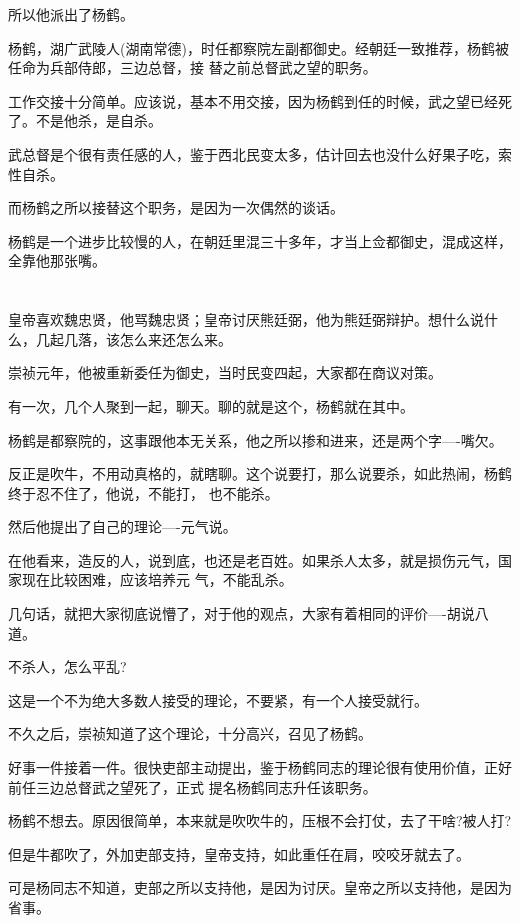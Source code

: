 \documentclass[11pt,a4paper,onecolumn]{article}
\begin{document}
所以他派出了杨鹤。

杨鹤，湖广武陵人(湖南常德)，时任都察院左副都御史。经朝廷一致推荐，杨鹤被任命为兵部侍郎，三边总督，接
替之前总督武之望的职务。

工作交接十分简单。应该说，基本不用交接，因为杨鹤到任的时候，武之望已经死了。不是他杀，是自杀。

武总督是个很有责任感的人，鉴于西北民变太多，估计回去也没什么好果子吃，索性自杀。

而杨鹤之所以接替这个职务，是因为一次偶然的谈话。

杨鹤是一个进步比较慢的人，在朝廷里混三十多年，才当上佥都御史，混成这样，全靠他那张嘴。

\section[\thesection]{}

皇帝喜欢魏忠贤，他骂魏忠贤；皇帝讨厌熊廷弼，他为熊廷弼辩护。想什么说什么，几起几落，该怎么来还怎么来。

崇祯元年，他被重新委任为御史，当时民变四起，大家都在商议对策。

有一次，几个人聚到一起，聊天。聊的就是这个，杨鹤就在其中。

杨鹤是都察院的，这事跟他本无关系，他之所以掺和进来，还是两个字----嘴欠。

反正是吹牛，不用动真格的，就瞎聊。这个说要打，那么说要杀，如此热闹，杨鹤终于忍不住了，他说，不能打，
也不能杀。

然后他提出了自己的理论----元气说。

在他看来，造反的人，说到底，也还是老百姓。如果杀人太多，就是损伤元气，国家现在比较困难，应该培养元
气，不能乱杀。

几句话，就把大家彻底说懵了，对于他的观点，大家有着相同的评价----胡说八道。

不杀人，怎么平乱?

这是一个不为绝大多数人接受的理论，不要紧，有一个人接受就行。

不久之后，崇祯知道了这个理论，十分高兴，召见了杨鹤。

好事一件接着一件。很快吏部主动提出，鉴于杨鹤同志的理论很有使用价值，正好前任三边总督武之望死了，正式
提名杨鹤同志升任该职务。

杨鹤不想去。原因很简单，本来就是吹吹牛的，压根不会打仗，去了干啥?被人打?

但是牛都吹了，外加吏部支持，皇帝支持，如此重任在肩，咬咬牙就去了。

可是杨同志不知道，吏部之所以支持他，是因为讨厌。皇帝之所以支持他，是因为省事。
\end{document}
